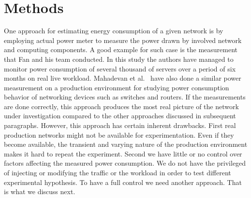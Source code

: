 \chapter{Methods}
\label{chapter:methods}
One approach for estimating energy consumption of a given network is by employing actual power meter to measure the power drawn by involved network and computing components. A good example for such case is the measurement that Fan and his team conducted\cite{DBLP:conf/isca/FanWB07}. In this study the authors have managed to monitor power consumption of several thousand of servers over a period of six months on real live workload. Mahadevan et al.{\ } have also done a similar power measurement on a production environment for studying power consumption behavior of networking devices such as switches and routers. If the measurements are done correctly, this approach produces the most real picture of the network under investigation compared to the other approaches discussed in subsequent paragraphs. However, this approach has certain inherent drawbacks. First real production networks might not be available for experimentation. Even if they become available, the transient and varying nature of the production environment makes it hard to repeat the experiment. Second we have little or no control over factors affecting the measured power consumption. We do not have the privileged of injecting or modifying the traffic or the workload in order to test different experimental hypothesis. To have a full control we need another approach. That is what we discuss next.

